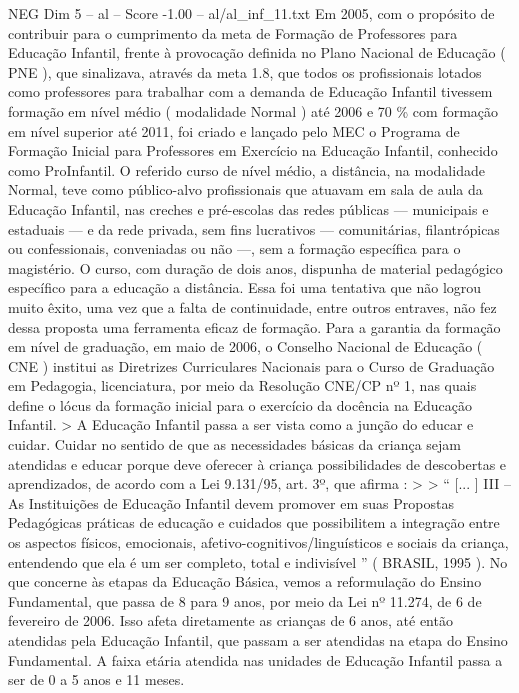 \begin{textsample}{NEG Dim 5 – al – Score -1.00 – al/al\_inf\_11.txt}
Em 2005, com o propósito de contribuir para o cumprimento da meta de Formação de Professores para Educação Infantil, frente à provocação definida no Plano Nacional de Educação ( PNE ), que sinalizava, através da meta 1.8, que todos os profissionais lotados como professores para trabalhar com a demanda de Educação Infantil tivessem formação em nível médio ( modalidade Normal ) até 2006 e 70 \% com formação em nível superior até 2011, foi criado e lançado pelo MEC o Programa de Formação Inicial para Professores em Exercício na Educação Infantil, conhecido como ProInfantil.
O referido curso de nível médio, a distância, na modalidade Normal, teve como público-alvo profissionais que atuavam em sala de aula da Educação Infantil, nas creches e pré-escolas das redes públicas — municipais e estaduais — e da rede privada, sem fins lucrativos — comunitárias, filantrópicas ou confessionais, conveniadas ou não —, sem a formação específica para o magistério.
O curso, com duração de dois anos, dispunha de material pedagógico específico para a educação a distância.
Essa foi uma tentativa que não logrou muito êxito, uma vez que a falta de continuidade, entre outros entraves, não fez dessa proposta uma ferramenta eficaz de formação.
Para a garantia da formação em nível de graduação, em maio de 2006, o Conselho Nacional de Educação ( CNE ) institui as Diretrizes Curriculares Nacionais para o Curso de Graduação em Pedagogia, licenciatura, por meio da Resolução CNE/CP nº 1, nas quais define o lócus da formação inicial para o exercício da docência na Educação Infantil. > A Educação Infantil passa a ser vista como a junção do educar e cuidar.
Cuidar no sentido de que as necessidades básicas da criança sejam atendidas e educar porque deve oferecer à criança possibilidades de descobertas e aprendizados, de acordo com a Lei 9.131/95, art. 3º, que afirma : > > “ [... ] III – As Instituições de Educação Infantil devem promover em suas Propostas Pedagógicas práticas de educação e cuidados que possibilitem a integração entre os aspectos físicos, emocionais, afetivo-cognitivos/linguísticos e sociais da criança, entendendo que ela é um ser completo, total e indivisível ” ( BRASIL, 1995 ).
No que concerne às etapas da Educação Básica, vemos a reformulação do Ensino Fundamental, que passa de 8 para 9 anos, por meio da Lei nº 11.274, de 6 de fevereiro de 2006.
Isso afeta diretamente as crianças de 6 anos, até então atendidas pela Educação Infantil, que passam a ser atendidas na etapa do Ensino Fundamental.
A faixa etária atendida nas unidades de Educação Infantil passa a ser de 0 a 5 anos e 11 meses.

\end{textsample}
